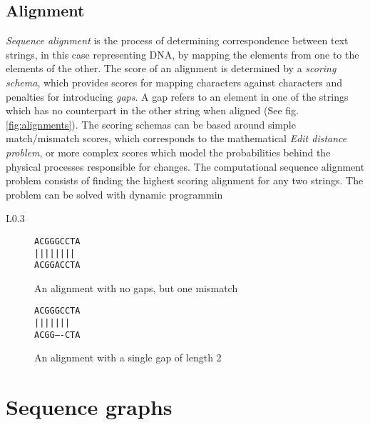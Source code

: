 \documentclass[thesis.tex]{subfiles}
\begin{document}
\subsection{Alignment}
\textit{Sequence alignment} is the process of determining correspondence between text strings, in this case representing DNA, by mapping the elements from one to the elements of the other. The score of an alignment is determined by a \textit{scoring schema}, which provides scores for mapping characters against characters and penalties for introducing \textit{gaps}. A gap refers to an element in one of the strings which has no counterpart in the other string when aligned (See fig. \ref{fig:alignments}). The scoring schemas can be based around simple match/mismatch scores, which corresponds to the mathematical \textit{Edit distance problem}, or more complex scores which model the probabilities behind the physical processes responsible for changes. The computational sequence alignment problem consists of finding the highest scoring alignment for any two strings. The problem can be solved with dynamic programmin
\begin{wrapfigure}{L}{0.3\textwidth}
		\begin{subfigure}[t]{\textwidth}
			\begin{mdframed}
				\begin{center}
					\texttt{ACGGGCCTA}\\
					\texttt{||||\space||||}\\
					\texttt{ACGGACCTA}
				\end{center}
			\end{mdframed}
			\caption{An alignment with no gaps, but one mismatch}
		\end{subfigure}
		\begin{subfigure}[b]{\textwidth}
			\begin{mdframed}
				\begin{center}
					\texttt{ACGGGCCTA}\\
					\texttt{||||\space\space|||}\\
					\texttt{ACGG----CTA}
				\end{center}
			\end{mdframed}
			\caption{An alignment with a single gap of length 2}
		\end{subfigure}
	\caption{Examples of aligned text strings}
	\label{fig:alignments}
\end{wrapfigure}
\section{Sequence graphs}
\end{document}

